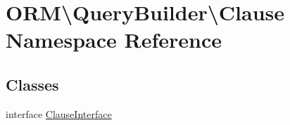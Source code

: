 \hypertarget{namespaceORM_1_1QueryBuilder_1_1Clause}{}\section{O\+RM\textbackslash{}Query\+Builder\textbackslash{}Clause Namespace Reference}
\label{namespaceORM_1_1QueryBuilder_1_1Clause}
\subsection*{Classes}
\begin{DoxyCompactItemize}
\item 
interface \hyperlink{interfaceORM_1_1QueryBuilder_1_1Clause_1_1ClauseInterface}{Clause\+Interface}
\end{DoxyCompactItemize}
